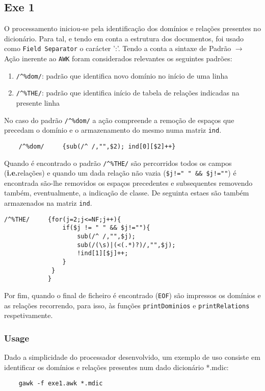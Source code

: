 \documentclass{llncs}
\begin{document}
\subsection{Exe 1}
O processamento iniciou-se pela identificação dos domínios e relações presentes no dicionário. Para tal, e tendo em conta a estrutura dos documentos, foi usado como \texttt{Field Separator} o carácter ':'.
Tendo a conta a sintaxe de Padrão $\to$ Ação inerente ao \texttt{AWK} foram considerados relevantes os seguintes padrões:
\begin{enumerate}
    \item \verb|/^%dom/|: padrão que identifica novo domínio no início de uma linha
    \item \verb|/^%THE/|: padrão que identifica início de tabela de relações indicadas na presente linha
\end{enumerate}
No caso do padrão \verb|/^%dom/| a ação compreende a remoção de espaços que precedam o domínio e o armazenamento do mesmo numa matriz \texttt{ind}.
\begin{Verbatim}
    /^%dom/     {sub(/^ /,"",$2); ind[0][$2]++}
\end{Verbatim}
Quando é encontrado o padrão \verb|/^%THE/| são percorridos todos os campos (\textbf{i.e.}relações) e quando um dada relação não vazia (\verb|$j!=" " && $j!=""|) é encontrada são-lhe removidos os espaços precedentes e subsequentes removendo também, eventualmente, a indicação de classe. De seguinta estaes são também armazenados na matriz \texttt{ind}.
\begin{Verbatim}
/^%THE/     {for(j=2;j<=NF;j++){
                if($j != " " && $j!=""){
                    sub(/^ /,"",$j);           
                    sub(/(\s)|(<(.*)?)/,"",$j);
                    !ind[1][$j]++;
                }                              
             }
            }

\end{Verbatim}

Por fim, quando o final de ficheiro é encontrado (\texttt{EOF}) são impressos os domínios e as relações recorrendo, para isso, às funções \texttt{printDominios} e \texttt{printRelations} respetivamente.

\subsubsection{Usage}
Dado a simplicidade do processador desenvolvido, um exemplo de uso consiste em identificar os domínios e relações presentes num dado dicionário *.mdic:
\begin{Verbatim}
    gawk -f exe1.awk *.mdic
\end{Verbatim}
\end{document}
